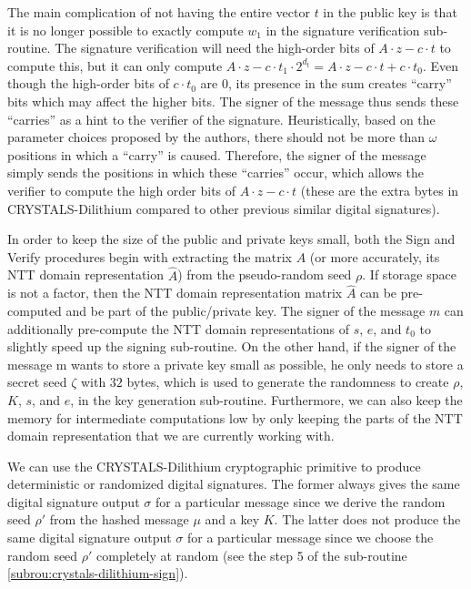 \documentclass[runningheads]{llncs}
\numberwithin{equation}{section}
\begin{document}
    The main complication of not having the entire vector $t$ in the public key is that it is no longer possible to exactly compute ${w}_{1}$ in the signature verification sub-routine. The signature verification will need the high-order bits of $A \cdot z - c \cdot t$ to compute this, but it can only compute $A \cdot z - c \cdot {t}_{1} \cdot {2}^{{d}_{t}} = A \cdot z - c \cdot t + c \cdot {t}_{0}$. Even though the high-order bits of $c \cdot {t}_{0}$ are $0$, its presence in the sum creates ``carry'' bits which may affect the higher bits. The signer of the message thus sends these ``carries'' as a hint to the verifier of the signature. Heuristically, based on the parameter choices proposed by the authors, there should not be more than $\omega$ positions in which a ``carry'' is caused. Therefore, the signer of the message simply sends the positions in which these ``carries'' occur, which allows the verifier to compute the high order bits of $A \cdot z - c \cdot t$ (these are the extra bytes in CRYSTALS-Dilithium compared to other previous similar digital signatures).

    In order to keep the size of the public and private keys small, both the Sign and Verify procedures begin with extracting the matrix $A$ (or more accurately, its NTT domain representation $\hat{A}$) from the pseudo-random seed $\rho$. If storage space is not a factor, then the NTT domain representation matrix $\hat{A}$ can be pre-computed and be part of the public/private key. The signer of the message $m$ can additionally pre-compute the NTT domain representations of $s$, $e$, and ${t}_{0}$ to slightly speed up the signing sub-routine. On the other hand, if the signer of the message m wants to store a private key small as possible, he only needs to store a secret seed $\zeta$ with $32$ bytes, which is used to generate the randomness to create $\rho$, $K$, $s$, and $e$, in the key generation sub-routine. Furthermore, we can also keep the memory for intermediate computations low by only keeping the parts of the NTT domain representation that we are currently working with.

    We can use the CRYSTALS-Dilithium cryptographic primitive to produce deterministic or randomized digital signatures. The former always gives the same digital signature output $\sigma$ for a particular message since we derive the random seed $\rho'$ from the hashed message $\mu$ and a key $K$. The latter does not produce the same digital signature output $\sigma$ for a particular message since we choose the random seed $\rho'$ completely at random (see the step 5 of the sub-routine \ref{subrou:crystals-dilithium-sign}).
\end{document}
